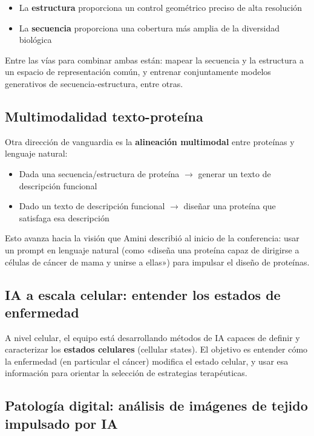 \begin{itemize}
    \item La \textbf{estructura} proporciona un control geométrico preciso de alta resolución
    \item La \textbf{secuencia} proporciona una cobertura más amplia de la diversidad biológica
\end{itemize}

Entre las vías para combinar ambas están: mapear la secuencia y la estructura a un espacio de representación común, y entrenar conjuntamente modelos generativos de secuencia-estructura, entre otras.

\subsection{Multimodalidad texto-proteína}

Otra dirección de vanguardia es la \textbf{alineación multimodal} entre proteínas y lenguaje natural:

\begin{itemize}
    \item Dada una secuencia/estructura de proteína $\rightarrow$ generar un texto de descripción funcional
    \item Dado un texto de descripción funcional $\rightarrow$ diseñar una proteína que satisfaga esa descripción
\end{itemize}

Esto avanza hacia la visión que Amini describió al inicio de la conferencia: usar un prompt en lenguaje natural (como «diseña una proteína capaz de dirigirse a células de cáncer de mama y unirse a ellas») para impulsar el diseño de proteínas.

\subsection{IA a escala celular: entender los estados de enfermedad}

A nivel celular, el equipo está desarrollando métodos de IA capaces de definir y caracterizar los \textbf{estados celulares} (cellular states). El objetivo es entender cómo la enfermedad (en particular el cáncer) modifica el estado celular, y usar esa información para orientar la selección de estrategias terapéuticas.

\subsection{Patología digital: análisis de imágenes de tejido impulsado por IA}

